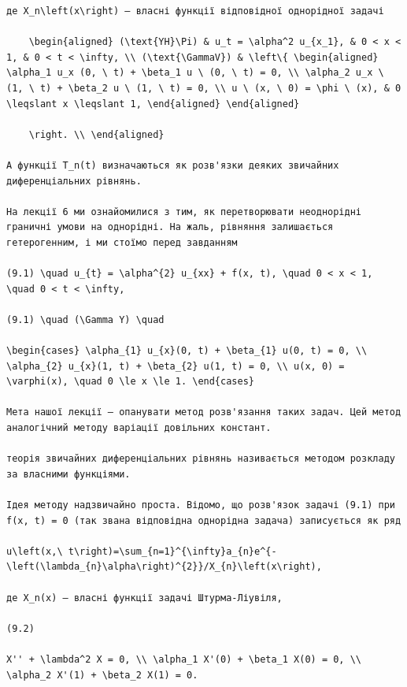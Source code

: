 \documentclass[
  ukrainian,
]{article}
\begin{document}
\begin{verbatim}
де X_n\left(x\right) — власні функції відповідної однорідної задачі

    \begin{aligned} (\text{YH}\Pi) & u_t = \alpha^2 u_{x_1}, & 0 < x < 1, & 0 < t < \infty, \\ (\text{\GammaV}) & \left\{ \begin{aligned} \alpha_1 u_x (0, \ t) + \beta_1 u \ (0, \ t) = 0, \\ \alpha_2 u_x \ (1, \ t) + \beta_2 u \ (1, \ t) = 0, \\ u \ (x, \ 0) = \phi \ (x), & 0 \leqslant x \leqslant 1, \end{aligned} \end{aligned}

    \right. \\ \end{aligned}

А функції T_n(t) визначаються як розв'язки деяких звичайних диференціальних рівнянь.

На лекції 6 ми ознайомилися з тим, як перетворювати неоднорідні граничні умови на однорідні. На жаль, рівняння залишається гетерогенним, і ми стоїмо перед завданням

(9.1) \quad u_{t} = \alpha^{2} u_{xx} + f(x, t), \quad 0 < x < 1, \quad 0 < t < \infty,

(9.1) \quad (\Gamma Y) \quad

\begin{cases} \alpha_{1} u_{x}(0, t) + \beta_{1} u(0, t) = 0, \\ \alpha_{2} u_{x}(1, t) + \beta_{2} u(1, t) = 0, \\ u(x, 0) = \varphi(x), \quad 0 \le x \le 1. \end{cases}

Мета нашої лекції — опанувати метод розв'язання таких задач. Цей метод аналогічний методу варіації довільних констант.

теорія звичайних диференціальних рівнянь називається методом розкладу за власними функціями.

Ідея методу надзвичайно проста. Відомо, що розв'язок задачі (9.1) при f(x, t) = 0 (так звана відповідна однорідна задача) записується як ряд

u\left(x,\ t\right)=\sum_{n=1}^{\infty}a_{n}e^{-\left(\lambda_{n}\alpha\right)^{2}}/X_{n}\left(x\right),

де X_n(x) — власні функції задачі Штурма-Ліувіля,

(9.2)

X'' + \lambda^2 X = 0, \\ \alpha_1 X'(0) + \beta_1 X(0) = 0, \\ \alpha_2 X'(1) + \beta_2 X(1) = 0.


\end{verbatim}
\end{document}
